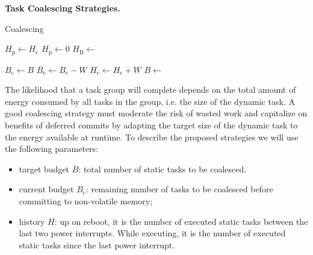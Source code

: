 \textbf{Task Coalescing Strategies.} 
%
\begin{algorithm}[t]
	\caption{Coalescing}
	\label{algo:genCoalescing}
	\scriptsize
	\begin{algorithmic}[1]
        \State $H_\text{p} \gets H_\text{c}$
        \State $H_\text{p} \gets 0$ 
        \State $H_\text{B} \leftarrow $ 

	        \State $ B_\text{c} \gets B$
		        \State {}
		        \State $B_\text{c} \gets B_\text{c} - W$
				\State $H_\text{c} \gets H_\text{c} + W$
	        \EndWhile
	         \State $B \leftarrow $ 
	        \State {}
        \EndWhile
	\end{algorithmic}
\end{algorithm}
%
%
The likelihood that a task group will complete depends on the total amount of
energy consumed by all tasks in the group, i.e. the size of the dynamic task.
%
A good coalescing strategy must moderate the risk of wasted work and capitalize
on benefits of deferred commits by adapting the target size of the dynamic task
to the energy available at runtime. 
%
To describe the proposed strategies we will use the following parameters:
\begin{itemize}
\item target budget $B$: total number of static tasks to be coalesced.
\item current budget $B_\text{c}$: remaining number of tasks to be coalesced before committing to non-volatile memory; 
\item history $H$: up on reboot, it is the number of executed static tasks between the last two power interrupts. While executing, it is the number of executed static tasks since the last power interrupt.
\end{itemize}


 

